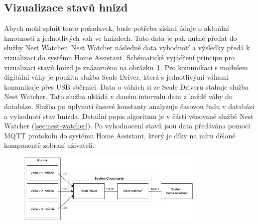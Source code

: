 \subsection{Vizualizace stavů hnízd}
Abych mohl splnit tento požadavek, bude potřeba získat údaje o aktuální hmotnosti z jednotlivých vah ve hnízdech.
Tato data je pak nutné předat do služby Nest Watcher.
Nest Watcher následně data vyhodnotí a výsledky předá k vizualizaci do systému Home Assistant.
Schématické vyjádření principu pro vizualizaci stavů hnízd je znázorněno na obrázku~\ref{fig:vizualizace_stavu_hnizd}. \newline
Pro komunikaci s modulem digitální váhy je použita služba Scale Driver, která s jednotlivými váhami komunikuje přes USB sběrnici.
Data o váhách si ze Scale Driveru stahuje služba Nest Watcher.
Tato služba ukládá v daném intervalu data z každé váhy do databáze.
Služba po uplynutí časové konstanty analyzuje časovou řadu v databázi a vyhodnotí stav hnízda.
Detailní popis algoritmu je v části věnované službě Nest Watcher (\ref{sec:nest-watcher}).
Po vyhodnocení stavů jsou data předávána pomocí MQTT protokolu do systému Home Assistant, který je díky na míru dělané komponentě zobrazí uživateli.
\begin{figure}[h]
    \centering
    \includegraphics[width=0.8\textwidth]{img/vizualizace_stavu_hnizd}
    \label{fig:vizualizace_stavu_hnizd}
\end{figure}

\clearpage

